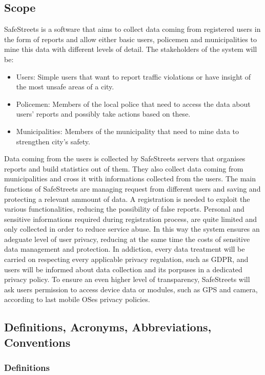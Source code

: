 \subsection{Scope}
SafeStreets is a software that aims to collect data coming from registered users in the form of reports and allow either basic users, policemen and municipalities to mine this data with different levels of detail.
The stakeholders of the system will be:
\begin{itemize}
	\item Users: Simple users that want to report traffic violations or have insight of the most unsafe areas of a city.
	\item Policemen: Members of the local police that need to access the data about users' reports and possibly take actions based on these. 
	\item Municipalities: Members of the municipality that need to mine data to strengthen city's safety.
\end{itemize}
Data coming from the users is collected by SafeStreets servers that organises reports and build statistics out of them.
They also collect data coming from municipalities and cross it with informations collected from the users.
The main functions of SafeStreets are managing request from different users and saving and protecting a relevant ammount of data.\newline
A registration is needed to exploit the various functionalities, reducing the possibility of false reports. Personal and sensitive informations required during registration process, are quite limited and only collected in order to reduce service abuse. In this way the system ensures an adeguate level of user privacy, reducing at the same time the costs of sensitive data management and protection.\newline
In addiction, every data treatment will be carried on respecting every applicable privacy regulation, such as GDPR, and users will be informed about data collection and its porpuses in a dedicated privacy policy.\newline
To ensure an even higher level of transparency, SafeStreets will ask users permission to access device data or modules, such as GPS and camera, according to last mobile OSes privacy policies.

\subsection{Definitions, Acronyms, Abbreviations, Conventions}
\subsubsection{Definitions}
